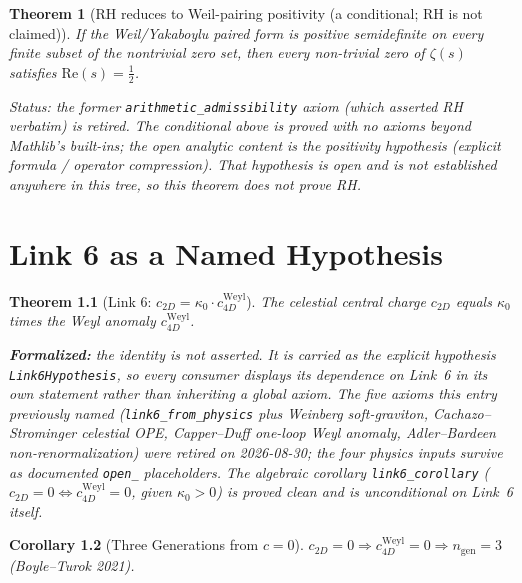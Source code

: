 \documentclass{report}
\newtheorem{theorem}{Theorem}[chapter]
\newtheorem{corollary}[theorem]{Corollary}
\theoremstyle{definition}
\begin{document}
\begin{theorem}[RH reduces to Weil-pairing positivity (a conditional; RH is not claimed)]
  \label{thm:rh}
  If the Weil/Yakaboylu paired form is positive semidefinite on every finite
  subset of the nontrivial zero set, then every non-trivial zero of $\zeta(s)$
  satisfies $\mathrm{Re}(s) = \tfrac{1}{2}$.

  \emph{Status:} the former \texttt{arithmetic\_admissibility} axiom (which
  asserted RH verbatim) is retired. The conditional above is proved with no
  axioms beyond Mathlib's built-ins; the open analytic content is the
  positivity hypothesis (explicit formula / operator compression). That hypothesis is
  open and is not established anywhere in this tree, so this theorem does not prove RH.
\end{theorem}

\chapter{Link 6 as a Named Hypothesis}

\begin{theorem}[Link 6: $c_{2D} = \kappa_0 \cdot c_{4D}^{\mathrm{Weyl}}$]
  \label{thm:link6}
  The celestial central charge $c_{2D}$ equals $\kappa_0$ times the Weyl anomaly
  $c_{4D}^{\mathrm{Weyl}}$.

  \textbf{Formalized:} the identity is \emph{not} asserted. It is carried as the
  explicit hypothesis \texttt{Link6Hypothesis}, so every consumer displays its
  dependence on Link~6 in its own statement rather than inheriting a global axiom.
  The five axioms this entry previously named (\texttt{link6\_from\_physics} plus
  Weinberg soft-graviton, Cachazo--Strominger celestial OPE, Capper--Duff one-loop
  Weyl anomaly, Adler--Bardeen non-renormalization) were retired on 2026-08-30;
  the four physics inputs survive as documented \texttt{open\_} placeholders.
  The algebraic corollary \texttt{link6\_corollary}
  ($c_{2D} = 0 \iff c_{4D}^{\mathrm{Weyl}} = 0$, given $\kappa_0 > 0$) is proved clean
  and is unconditional on Link~6 itself.
\end{theorem}

\begin{corollary}[Three Generations from $c = 0$]
  \label{cor:three-gen-link6}
  $c_{2D} = 0 \Rightarrow c_{4D}^{\mathrm{Weyl}} = 0 \Rightarrow n_{\mathrm{gen}} = 3$
  (Boyle--Turok 2021).
\end{corollary}
\end{document}
